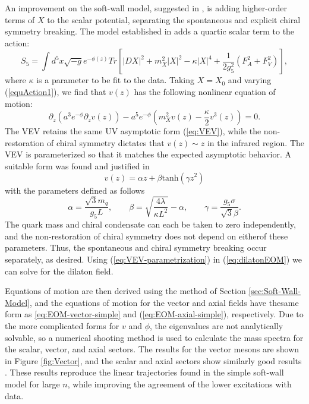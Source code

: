 An improvement on the soft-wall model, suggested in \cite{karch-katz-son-adsqcd}, is adding higher-order terms of $X$ to the scalar potential, separating the spontaneous and explicit chiral symmetry breaking. 
The model established in \cite{gherghetta-kelley} adds a quartic scalar term to the action:
\begin{equation}
S_{5}=\int d^{5}x\sqrt{-g}e^{-\phi(z)}Tr\left[|DX|^{2}+m_{X}^{2}|X|^{2}-\kappa|X|^{4}+\frac{1}{2g_{5}^{2}}(F_{A}^{2}+F_{V}^{2})\right],\label{equAction1}
\end{equation}
where $\kappa$ is a parameter to be fit to the data.
 Taking $X=X_{0}$ and varying (\ref{equAction1}), we find that $v(z)$ has the following nonlinear equation of motion:
\begin{equation}
\partial_{z}(a^{3}e^{-\phi}\partial_{z}v(z))-a^{5}e^{-\phi}\left(m_{X}^{2}v(z)-\frac{\kappa}{2}v^{3}(z)\right)=0.\label{eq:dilatonEOM}
\end{equation}
The VEV retains the same UV asymptotic form (\ref{eq:VEV}), while the non-restoration of chiral symmetry dictates that $v(z)\sim z$ in the infrared region. 
The VEV is parameterized so that it matches the expected asymptotic behavior. 
A suitable form was found and justified in \cite{gherghetta-kelley}
\begin{equation}
v(z)=\alpha z+\beta \mathrm{tanh}(\gamma z^{2})\label{eq:VEV-parametrization}
\end{equation}
with the parameters defined as follows
\[
\alpha=\frac{\sqrt{3}m_{q}}{g_{5}L},\qquad\beta=\sqrt{\frac{4\lambda}{\kappa L^{2}}}-\alpha,\qquad\gamma=\frac{g_{5}\sigma}{\sqrt{3}\beta}.
\]
 The quark mass and chiral condensate can each be taken to zero independently, and the non-restoration of chiral symmetry does not depend on eitherof these parameters. 
 Thus, the spontaneous and chiral symmetry breaking occur separately, as desired. 
Using (\ref{eq:VEV-parametrization}) in (\ref{eq:dilatonEOM}) we can solve for the dilaton field.

Equations of motion are then derived using the method of Section \ref{sec:Soft-Wall-Model}, and the equations of motion for the vector and axial fields have thesame form as \ref{eq:EOM-vector-simple} and (\ref{eq:EOM-axial-simple}), respectively. 
Due to the more complicated forms for $v$ and $\phi$, the eigenvalues are not analytically solvable, so a numerical shooting method is used to calculate the mass spectra for the scalar, vector,
and axial sectors. 
The results for the vector mesons are shown in Figure \ref{fig:Vector}, and the scalar and axial sectors show similarly good results \cite{gherghetta-kelley}. 
These results reproduce the linear trajectories found in the simple soft-wall model \cite{karch-katz-son-adsqcd} for large $n$, while improving the agreement of the lower excitations with data.

